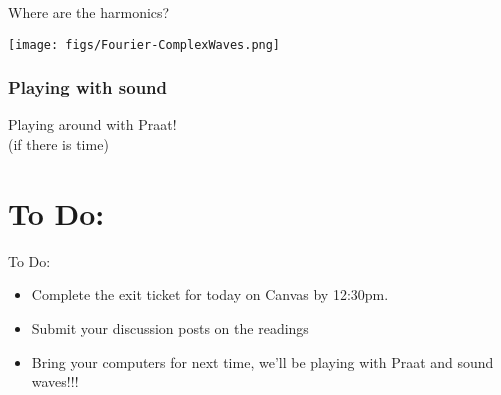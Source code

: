 \documentclass[professionalfonts]{beamer}
\begin{document}
\begin{frame}{Where are the harmonics?}
    \begin{center}
        \texttt{[image: figs/Fourier-ComplexWaves.png]}
    \end{center}
\end{frame}

\begin{frame}
    \frametitle{Playing with sound}
    \begin{center}
        {\Huge Playing around with Praat!}\\
        (if there is time)
    \end{center}
\end{frame}

\section*{To Do:}
\begin{frame}{To Do:}
    \begin{itemize}
        \item Complete the exit ticket for today on Canvas by 12:30pm.
        \item Submit your discussion posts on the readings
        \item Bring your computers for next time, we'll be playing with Praat and sound waves!!!
    \end{itemize}
\end{frame}

\end{document}

